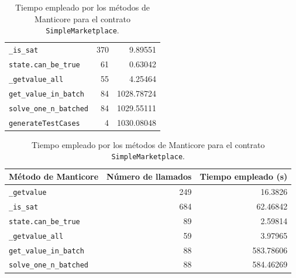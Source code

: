 \begin{table}[ht]
\begin{minipage}{0.95\textwidth}
\begin{tabular}[t]{l @{\hskip 30pt} r @{\hskip 30pt} r}
            \rowcolor{color1} \texttt{\_is\_sat}              & 370                         & 9.89551                      \\
            \rowcolor{color2} \texttt{state.can\_be\_true}    & 61                          & 0.63042                      \\
            \rowcolor{color1} \texttt{\_getvalue\_all}        & 55                          & 4.25464                      \\
            \rowcolor{color2} \texttt{get\_value\_in\_batch}  & 84                          & 1028.78724                   \\
            \rowcolor{color2} \texttt{solve\_one\_n\_batched} & 84                          & 1029.55111                   \\
            \rowcolor{color3} \texttt{generateTestCases}      & 4                           & 1030.08048                   \\
            \bottomrule
        \end{tabular}
        \caption{Tiempo empleado por los métodos de Manticore para el contrato \texttt{SimpleMarketplace}.}
        \label{tab:performance-SimpleMarketplace}
    \end{minipage}
    \begin{minipage}{0.95\textwidth}
        \centering
        \begin{tabular}[t]{l @{\hskip 30pt} r @{\hskip 30pt} r}
            \toprule
            \textbf{Método de Manticore}                      & \textbf{Número de llamados} & \textbf{Tiempo empleado (s)} \\
            \midrule
            \rowcolor{color1} \texttt{\_getvalue}             & 249                         & 16.3826                      \\
            \rowcolor{color1} \texttt{\_is\_sat}              & 684                         & 62.46842                     \\
            \rowcolor{color2} \texttt{state.can\_be\_true}    & 89                          & 2.59814                      \\
            \rowcolor{color1} \texttt{\_getvalue\_all}        & 59                          & 3.97965                      \\
            \rowcolor{color2} \texttt{get\_value\_in\_batch}  & 88                          & 583.78606                    \\
            \rowcolor{color2} \texttt{solve\_one\_n\_batched} & 88                          & 584.46269                    \\

\end{tabular}
\end{minipage}
\end{table}
